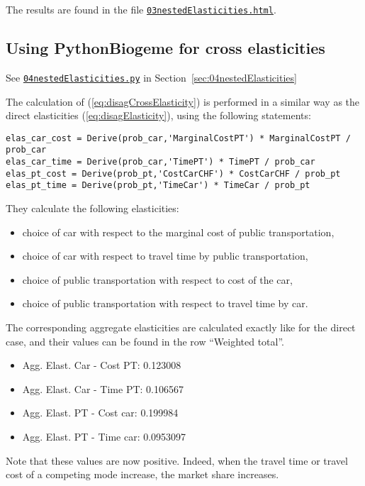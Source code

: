 \documentclass[12pt,a4paper]{article}
\newcommand{\req}[1]{(\ref{#1})}
\begin{document}
The results are found in the file \href{http://biogeme.epfl.ch/examples/indicators/python/03nestedElasticities.html}{\lstinline$03nestedElasticities.html$}.

\subsection{Using PythonBiogeme for cross elasticities}

\begin{flushright}
See \href{http://biogeme.epfl.ch/examples/indicators/python/04nestedElasticities.py}{\lstinline$04nestedElasticities.py$} in Section~\ref{sec:04nestedElasticities}
\end{flushright}



The calculation of \req{eq:disagCrossElasticity} is performed in a
similar way as the direct elasticities \req{eq:disagElasticity}, using the following statements:
\begin{lstlisting}
elas_car_cost = Derive(prob_car,'MarginalCostPT') * MarginalCostPT / prob_car
elas_car_time = Derive(prob_car,'TimePT') * TimePT / prob_car
elas_pt_cost = Derive(prob_pt,'CostCarCHF') * CostCarCHF / prob_pt
elas_pt_time = Derive(prob_pt,'TimeCar') * TimeCar / prob_pt
\end{lstlisting}
They calculate the following elasticities:
\begin{itemize}
\item choice of car with respect to the marginal cost of public
  transportation,
\item choice of car with respect to travel time by public
  transportation,
\item choice of public transportation with respect to cost of the
    car,
\item choice of public transportation with respect to travel time by
  car.
\end{itemize}
The corresponding aggregate elasticities are calculated exactly like
for the direct case, and their values can be found in the row
``Weighted total''.
\begin{itemize}
\item Agg. Elast. Car - Cost PT: 0.123008
\item Agg. Elast. Car - Time PT: 0.106567
\item Agg. Elast. PT - Cost car: 0.199984
\item Agg. Elast. PT - Time car: 0.0953097
\end{itemize}
Note that these values are now positive. Indeed, when the travel time
or travel cost of a competing mode increase, the market share
increases.
\end{document}
